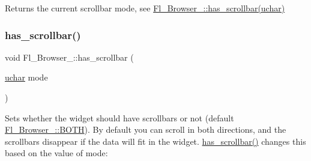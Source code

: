 Returns the current scrollbar mode, see \hyperlink{class_fl___browser___abad9f952fd007be8afcd1e3ca7ea1b86}{Fl\+\_\+\+Browser\+\_\+\+::has\+\_\+scrollbar(uchar)} \mbox{\label{class_fl___browser___abad9f952fd007be8afcd1e3ca7ea1b86}} 
\subsubsection{\texorpdfstring{has\+\_\+scrollbar()}{has\_scrollbar()}\hspace{0.1cm}{\footnotesize\ttfamily [2/2]}}
{\footnotesize\ttfamily void Fl\+\_\+\+Browser\+\_\+\+::has\+\_\+scrollbar (\begin{DoxyParamCaption}\item[{\hyperlink{fl__types_8h_a65f85814a8290f9797005d3b28e7e5fc}{uchar}}]{mode }\end{DoxyParamCaption})\hspace{0.3cm}{\ttfamily [inline]}}

Sets whether the widget should have scrollbars or not (default \hyperlink{class_fl___browser___ae31c28a4c79819d686805fdd1e48698eaab8e1ce95f30ab95086a09f50fc9e7b6}{Fl\+\_\+\+Browser\+\_\+\+::\+B\+O\+TH}). By default you can scroll in both directions, and the scrollbars disappear if the data will fit in the widget. \hyperlink{class_fl___browser___a67d0ca392fbc14371277661a4ab75fc7}{has\+\_\+scrollbar()} changes this based on the value of {\ttfamily mode\+:} 


